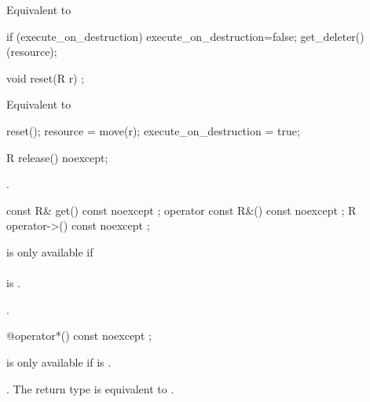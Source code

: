 \documentclass[ebook,11pt,article]{memoir}
\begin{document}
\pnum
\effects Equivalent to
\begin{codeblock}
  if (execute_on_destruction) {
    execute_on_destruction=false;
    get_deleter()(resource);
  }
\end{codeblock}

\begin{itemdecl}
void reset(R r) ;
\end{itemdecl}

\pnum
\effects Equivalent to
\begin{codeblock}
  reset();
  resource = move(r);
  execute_on_destruction = true;
\end{codeblock}


\begin{itemdecl}
R release() noexcept;
\end{itemdecl}

\pnum
\effects {}.

\pnum
\returns {}

\begin{itemdecl}
const R& get() const noexcept ;
operator const R&() const noexcept ;
R operator->() const noexcept ;
\end{itemdecl}

\pnum
\requires {} is only available if \\
\\ is . 

\pnum
\returns {}.

\begin{itemdecl}
@\seebelow@ operator*() const noexcept ;
\end{itemdecl}

\pnum
\requires {} is only available if  is .

\pnum
\returns {}. \enternote The return type is equivalent to 
. \exitnote
\end{document}
